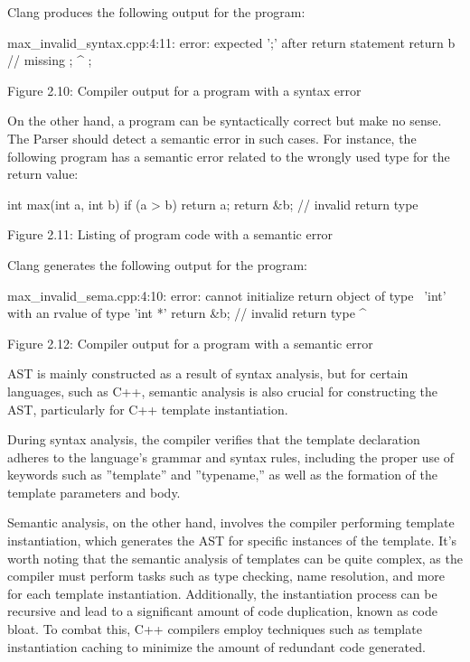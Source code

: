Clang produces the following output for the program:

\begin{shell}
max_invalid_syntax.cpp:4:11: error: expected ';' after return statement
  return b // missing ;
          ^
          ;
\end{shell}

\begin{center}
Figure 2.10: Compiler output for a program with a syntax error
\end{center}

On the other hand, a program can be syntactically correct but make no sense. The Parser should detect a semantic error in such cases. For instance, the following program has a semantic error related to the wrongly used type for the return value:

\begin{cpp}
int max(int a, int b) {
  if (a > b)
    return a;
  return &b; // invalid return type
}
\end{cpp}

\begin{center}
Figure 2.11: Listing of program code with a semantic error
\end{center}

Clang generates the following output for the program:

\begin{shell}
max_invalid_sema.cpp:4:10: error: cannot initialize return object of type \
'int' with an rvalue of type 'int *'
  return &b; // invalid return type
         ^~
\end{shell}

\begin{center}
Figure 2.12: Compiler output for a program with a semantic error
\end{center}

AST is mainly constructed as a result of syntax analysis, but for certain languages, such as C++, semantic analysis is also crucial for constructing the AST, particularly for C++ template instantiation.

During syntax analysis, the compiler verifies that the template declaration adheres to the language's grammar and syntax rules, including the proper use of keywords such as ”template” and ”typename,” as well as the formation of the template parameters and body.

Semantic analysis, on the other hand, involves the compiler performing template instantiation, which generates the AST for specific instances of the template. It's worth noting that the semantic analysis of templates can be quite complex, as the compiler must perform tasks such as type checking, name resolution, and more for each template instantiation. Additionally, the instantiation process can be recursive and lead to a significant amount of code duplication, known as code bloat. To combat this, C++ compilers employ techniques such as template instantiation caching to minimize the amount of redundant code generated.

